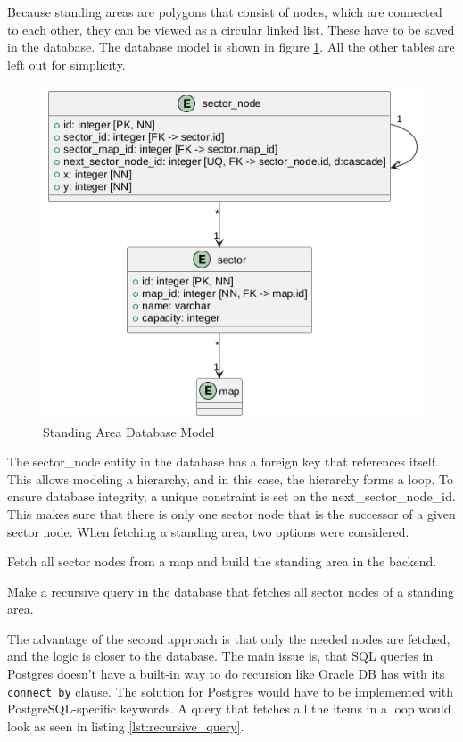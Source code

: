 Because standing areas are polygons that consist of nodes, which are connected to each other, they can be viewed as a circular linked list. These have to be saved in the database. The database model is shown in figure \ref{fig:standing_area_db_model}. All the other tables are left out for simplicity.

\begin{figure}
    \centering
    \includegraphics[scale=0.5]{pics/standing-area-db.png}
    \caption{Standing Area Database Model}
    \label{fig:standing_area_db_model}
\end{figure}

The sector\_node entity in the database has a foreign key that references itself. This allows modeling a hierarchy, and in this case, the hierarchy forms a loop. To ensure database integrity, a unique constraint is set on the next\_sector\_node\_id. This makes sure that there is only one sector node that is the successor of a given sector node. When fetching a standing area, two options were considered.

\begin{compactenum}
\item Fetch all sector nodes from a map and build the standing area in the backend.
\item Make a recursive query in the database that fetches all sector nodes of a standing area.
\end{compactenum}

The advantage of the second approach is that only the needed nodes are fetched, and the logic is closer to the database. The main issue is, that SQL queries in Postgres doesn't have  a built-in way to do recursion like Oracle DB has with its \texttt{connect by} clause. The solution for Postgres would have to be implemented with PostgreSQL-specific keywords. A query that fetches all the items in a loop would look as seen in listing \ref{lst:recursive_query}. 

